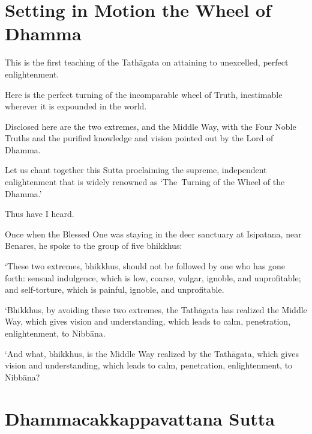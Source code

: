 
\chapterTocDelegatePageNumber
\chapter{Setting in Motion the Wheel of Dhamma}%

\setTocDelegatedPageNumber
\englishText
\renewcommand{\englishTitle}{Setting in Motion the Wheel of Dhamma}

\begin{leader}

This is the first teaching of the Tathāgata on attaining to unexcelled,
perfect enlightenment.

Here is the perfect turning of the incomparable wheel of Truth,
inestimable wherever it is expounded in the world.

Disclosed here are the two extremes, and the Middle Way, with the Four Noble
Truths and the purified knowledge and vision pointed out by the Lord of
Dhamma.

Let us chant together this Sutta proclaiming the supreme, independent
enlightenment that is widely renowned as ‘The~Turning of the Wheel of
the Dhamma.’

\end{leader}

Thus have I heard.

Once when the Blessed One was staying in the deer sanctuary at
Isipatana, near Benares, he spoke to the group of five bhikkhus:

‘These two extremes, bhikkhus, should not be followed by one who has
gone forth: sensual indulgence, which is low, coarse, vulgar, ignoble,
and unprofitable; and self-torture, which is painful, ignoble, and
unprofitable.

‘Bhikkhus, by avoiding these two extremes, the Tathāgata has realized
the Middle Way, which gives vision and understanding, which leads to
calm, penetration, enlightenment, to Nibbāna.

‘And what, bhikkhus, is the Middle Way realized by the Tathāgata, which
gives vision and understanding, which leads to calm, penetration,
enlightenment, to Nibbāna?

\chapterTocSubIndentTrue
\chapter{Dhammacakkappavattana Sutta}%

